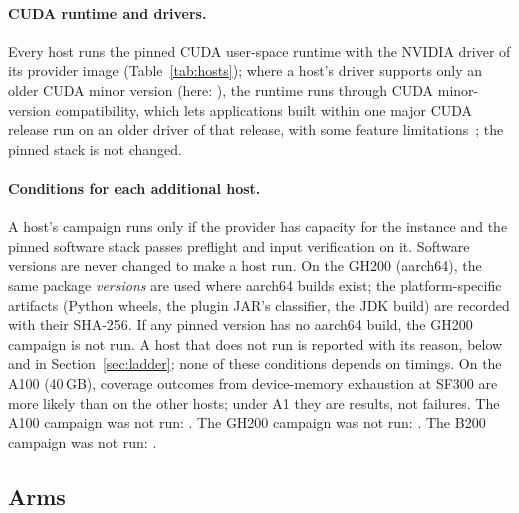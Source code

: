 \documentclass[11pt]{article}
\begin{document}
\paragraph{CUDA runtime and drivers.} Every host runs the pinned CUDA
 user-space runtime with the NVIDIA driver of its
provider image (Table~\ref{tab:hosts}); where a host's driver supports only an
older CUDA minor version (here: ), the runtime
runs through CUDA minor-version compatibility, which lets applications built
within one major CUDA release run on an older driver of that release, with
some feature limitations~\citep{nvidia_cuda_compat}; the pinned stack is not
changed.

\paragraph{Conditions for each additional host.} A host's campaign runs only if
the provider has capacity for the instance and the pinned software stack passes
preflight and input verification on it. Software versions are never changed
to make a host run. On the GH200 (aarch64), the same package \emph{versions}
are used where aarch64 builds exist; the platform-specific artifacts (Python
wheels, the plugin JAR's classifier, the JDK build) are recorded with their
SHA-256. If any pinned version has no aarch64 build, the GH200 campaign is not
run. A host that does not run is reported with its reason, below and in
Section~\ref{sec:ladder}; none of these conditions depends on timings. On the
A100 (40\,GB), coverage outcomes from device-memory exhaustion at SF300 are
more likely than on the other hosts; under A1 they are results, not failures.
\ifaonehundredran\else
The A100 campaign was not run: .
\fi
\ifghtwohundredran\else
The GH200 campaign was not run: .
\fi
\ifbtwohundredran\else
The B200 campaign was not run: .
\fi

\subsection{Arms}
\label{sec:arms}
\end{document}

